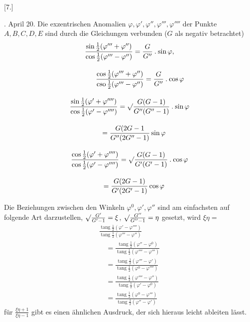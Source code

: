 \begingroup
\renewcommand{\arraystretch}{1.45}
\fancyhead[L]{}
\par\medskip{}\centerline{[7.]}\nobreak{}. April 20. Die exzentrischen Anomalien $\varphi,\varphi',\varphi'',\varphi''',\varphi''''$ der Punkte
$A,B,C,D,E$ sind durch die Gleichungen verbunden ($G$ als negativ betrachtet)
\[
\begin{gathered} \frac{\sin\frac12(\varphi'''+\varphi'')}{\cos\frac12(\varphi'''-\varphi'')} =\frac{G}{G''}\mathbin{.}\sin\varphi,\\[9pt]\quad{}\qquad \frac{\cos\frac12(\varphi'''+\varphi'')}{\operatorname{cso}\frac12(\varphi'''-\varphi'')} =\frac{G}{G''}\mathbin{.}\cos\varphi\\[9pt] \frac{\sin\frac12(\varphi'+\varphi'''')}{\cos\frac12(\varphi'-\varphi'''')} =\surd\frac{G(G-1)}{G''(G''-1)}\mathbin{.}\sin\varphi \\[9pt]\quad{}=\frac{G(2G-1}{G''(2G''-1)}\sin\varphi\\[9pt] \frac{\cos\frac12(\varphi'+\varphi'''')}{\cos\frac12(\varphi'-\varphi'''')} =\surd\frac{G(G-1)}{G'(G'-1)}\mathbin{.}\cos\varphi \\[9pt]\quad{}=\frac{G(2G-1)}{G'(2G'-1)}\cos\varphi \end{gathered}
\]

Die Beziehungen zwischen den Winkeln $\varphi^0,\varphi',\varphi''$ sind am einfachsten auf
folgende Art darzustellen, $\surd\frac{G'}{G'-1}=\xi$, $\surd\frac{G''}{G''-1}=\eta$ gesetzt, wird $\xi\eta=$
\[
\begin{gathered}\frac{\operatorname{tang}\frac12(\varphi'-\varphi'''')}{\operatorname{tang}\frac12(\varphi'''-\varphi'')} \\[9pt]\quad{}=\frac{\operatorname{tang}\frac12(\varphi''-\varphi^0)}{\operatorname{tang}\frac12(\varphi''''-\varphi''')} \\[9pt]\quad{}=\frac{\operatorname{tang}\frac12(\varphi'''-\varphi')}{\operatorname{tang}\frac12(\varphi^0-\varphi'''')} \\[9pt]\quad{}=\frac{\operatorname{tang}\frac12(\varphi''''-\varphi'')}{\operatorname{tang}\frac12(\varphi'-\varphi^0)} \\[9pt]\quad{}=\frac{\operatorname{tang}\frac12(\varphi^0-\varphi''')}{\operatorname{tang}\frac12(\varphi''-\varphi')}\end{gathered}
\]
für $\frac{\xi\eta+1}{\xi\eta-1}$ gibt es einen ähnlichen Ausdruck, der sich hieraus leicht ableiten lässt.



